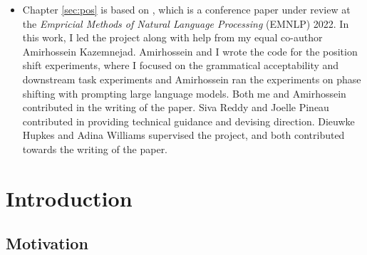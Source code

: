 \documentclass[letterpaper, 12pt]{report}
\begin{document}
\begin{itemize}
  \item Chapter \autoref{sec:pos} is based on \cite{sinha2022pos}, which is a conference paper under review at the \textit{Empricial Methods of Natural Language Processing} (EMNLP) 2022. In this work, I led the project along with help from my equal co-author Amirhossein Kazemnejad. Amirhossein and I wrote the code for the position shift experiments, where I focused on the grammatical acceptability and downstream task experiments and Amirhossein ran the experiments on phase shifting with prompting large language models. Both me and Amirhossein contributed in the writing of the paper. Siva Reddy and Joelle Pineau contributed in providing technical guidance and devising direction. Dieuwke Hupkes and Adina Williams supervised the project, and both contributed towards the writing of the paper.
\end{itemize}

\listoffigures{}

\listoftables{}

\clearpage
\setcounter{tocdepth}{3}
\tableofcontents

\clearpage


\chapter{Introduction}
\label{chap:intro}


\section{Motivation}
\end{document}
